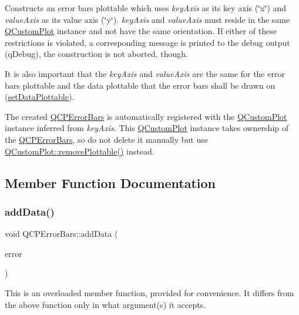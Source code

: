Constructs an error bars plottable which uses {\itshape key\+Axis} as its key axis (\char`\"{}x\char`\"{}) and {\itshape value\+Axis} as its value axis (\char`\"{}y\char`\"{}). {\itshape key\+Axis} and {\itshape value\+Axis} must reside in the same \hyperlink{class_q_custom_plot}{Q\+Custom\+Plot} instance and not have the same orientation. If either of these restrictions is violated, a corresponding message is printed to the debug output (q\+Debug), the construction is not aborted, though.

It is also important that the {\itshape key\+Axis} and {\itshape value\+Axis} are the same for the error bars plottable and the data plottable that the error bars shall be drawn on (\hyperlink{class_q_c_p_error_bars_aabb42a964cfbf780cd1c79850c7cd989}{set\+Data\+Plottable}).

The created \hyperlink{class_q_c_p_error_bars}{Q\+C\+P\+Error\+Bars} is automatically registered with the \hyperlink{class_q_custom_plot}{Q\+Custom\+Plot} instance inferred from {\itshape key\+Axis}. This \hyperlink{class_q_custom_plot}{Q\+Custom\+Plot} instance takes ownership of the \hyperlink{class_q_c_p_error_bars}{Q\+C\+P\+Error\+Bars}, so do not delete it manually but use \hyperlink{class_q_custom_plot_af3dafd56884208474f311d6226513ab2}{Q\+Custom\+Plot\+::remove\+Plottable()} instead. 

\subsection{Member Function Documentation}
\mbox{\label{class_q_c_p_error_bars_aae296ad9817b3fa418db284af81cecf8}} 
\subsubsection{\texorpdfstring{add\+Data()}{addData()}\hspace{0.1cm}{\footnotesize\ttfamily [1/4]}}
{\footnotesize\ttfamily void Q\+C\+P\+Error\+Bars\+::add\+Data (\begin{DoxyParamCaption}\item[{const Q\+Vector$<$ double $>$ \&}]{error }\end{DoxyParamCaption})}

This is an overloaded member function, provided for convenience. It differs from the above function only in what argument(s) it accepts.

